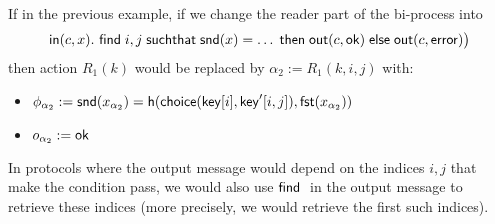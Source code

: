 \begin{example}
  If in the previous example, if we change the reader part of the bi-process into
  $$\textsf{in}(c,x).~ \textsf{find}\; i,j \;\textsf{suchthat}\; \mathsf{snd}(x) = \ldots \;\textsf{then}\;
  \textsf{out}(c,\mathsf{ok}) \;\textsf{else}\; \textsf{out}(c,\mathsf{error})\bigr)$$
  then action $R_1(k)$ would be replaced by $\alpha_2 := R_1(k,i,j)$
  with:
  \begin{itemize}
    \item $\phi_{\alpha_2} := \mathsf{snd}(x_{\alpha_2}) =
      \mathsf{h}(\mathsf{choice}(\mathsf{key}[i],\mathsf{key}'[i,j]),\mathsf{fst}(x_{\alpha_2}))$
    \item $o_{\alpha_2} := \mathsf{ok}$
  \end{itemize}
  In protocols where the output message would depend on the indices $i,j$
  that make the condition pass, we would also use $\textsf{find}\;$ in the
  output message to retrieve these indices (more precisely, we would retrieve
  the first such indices).
\end{example}

